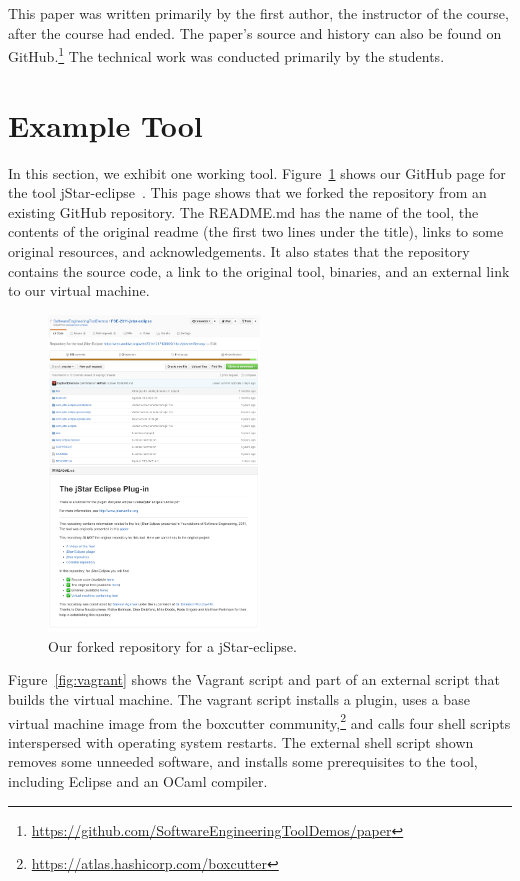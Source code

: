 \documentclass[10pt,conference]{IEEEtran}
\begin{document}
This paper was written primarily by the first author,
the instructor of the course, after the course 
had ended.
The paper's source and history can also be found 
on GitHub.\footnote{\url{https://github.com/SoftwareEngineeringToolDemos/paper}}
The technical work was conducted primarily by the students.

\section{Example Tool}

In this section, we exhibit one working tool.
Figure~\ref{fig:jstar} shows our GitHub page for
the tool jStar-eclipse~\cite{jstar}.
This page shows that we forked
the repository from an existing GitHub repository.
The README.md has the name of the tool, 
the contents of the original readme 
(the first two lines under the title),
links to some original resources,
and acknowledgements.
It also states that the repository contains
the source code, a link to the original tool,
binaries, and an external link to our virtual
machine. 


\begin{figure}[t]
  \centering
    \includegraphics[width=0.5\textwidth]{jstar.png}
  \caption{Our forked repository for a jStar-eclipse.}\label{fig:jstar}
\end{figure}

Figure~\ref{fig:vagrant} shows the Vagrant script and 
part of an external script that builds the virtual machine.
The vagrant script installs a plugin, 
uses a base virtual machine image from the boxcutter 
community,\footnote{\url{https://atlas.hashicorp.com/boxcutter}}
and calls four shell scripts interspersed with operating system 
restarts.
The external shell script shown removes some unneeded software,
and installs some prerequisites to the tool, including Eclipse and
an OCaml compiler. 
\end{document}
